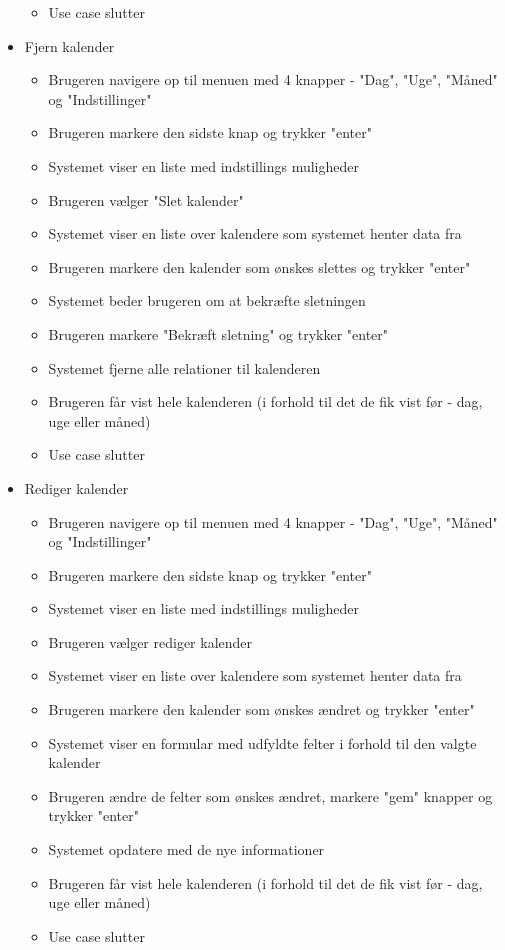 \documentclass{article}
\begin{document}
\begin{itemize}
\begin{itemize}
   \item Use case slutter
   \end{itemize}
   \item Fjern kalender
   \begin{itemize}
   \item Brugeren navigere op til menuen med 4 knapper - "Dag", "Uge", "Måned" og "Indstillinger"
   \item Brugeren markere den sidste knap og trykker "enter"
   \item Systemet viser en liste med indstillings muligheder
   \item Brugeren vælger "Slet kalender"
   \item Systemet viser en liste over kalendere som systemet henter data fra
   \item Brugeren markere den kalender som ønskes slettes og trykker "enter"
   \item Systemet beder brugeren om at bekræfte sletningen
   \item Brugeren markere "Bekræft sletning" og trykker "enter"
   \item Systemet fjerne alle relationer til kalenderen
   \item Brugeren får vist hele kalenderen (i forhold til det de fik vist før - dag, uge eller måned)
   \item Use case slutter
   \end{itemize}
   \item Rediger kalender
   \begin{itemize}
   \item Brugeren navigere op til menuen med 4 knapper - "Dag", "Uge", "Måned" og "Indstillinger"
   \item Brugeren markere den sidste knap og trykker "enter"
   \item Systemet viser en liste med indstillings muligheder
   \item Brugeren vælger rediger kalender
   \item Systemet viser en liste over kalendere som systemet henter data fra
   \item Brugeren markere den kalender som ønskes ændret og trykker "enter"
   \item Systemet viser en formular med udfyldte felter i forhold til den valgte kalender
   \item Brugeren ændre de felter som ønskes ændret, markere "gem" knapper og trykker "enter"
   \item Systemet opdatere med de nye informationer
   \item Brugeren får vist hele kalenderen (i forhold til det de fik vist før - dag, uge eller måned)
   \item Use case slutter
   \end{itemize}
   \end{itemize}
   
\end{document}
